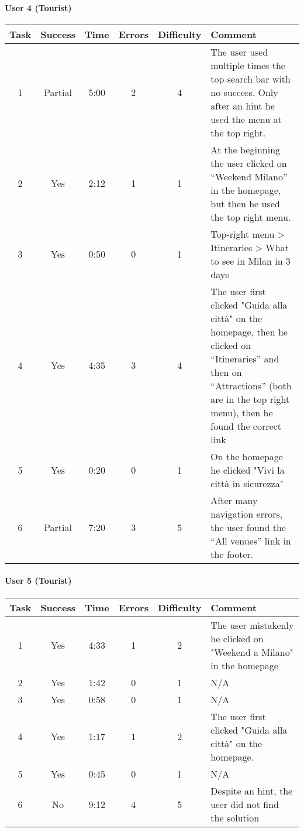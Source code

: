\begin{small}
\paragraph{User 4 (Tourist)}
\begin{tabularx}{\linewidth}{c c c c c X}
    \toprule
    \textbf{Task} & \textbf{Success} & \textbf{Time}
     & \textbf{Errors} & \textbf{Difficulty} & \textbf{Comment} \\
    \midrule
    1 & Partial & 5:00 & 2 & 4 & The user used multiple times the top search bar with no success. Only after an hint he used the menu at the top right. \\ \midrule
    2 & Yes & 2:12 & 1 & 1 & At the beginning the user clicked on ``Weekend Milano'' in the homepage, but then he used the top right menu.  \\ \midrule
    3 & Yes & 0:50 & 0 & 1 & Top-right menu > Itineraries > What to see in Milan in 3 days \\ \midrule
    4 & Yes & 4:35 & 3 & 4 & The user first clicked "Guida alla città" on the homepage, then he clicked on ``Itineraries'' and then on ``Attractions'' (both are in the top right menu), then he found the correct link \\ \midrule
    5 & Yes & 0:20 & 0 & 1 & On the homepage he clicked "Vivi la città in sicurezza" \\ \midrule
    6 & Partial & 7:20 & 3 & 5 & After many navigation errors, the user found the ``All venues'' link in the footer. \\ \bottomrule
\end{tabularx}

\paragraph{User 5 (Tourist)}
\begin{tabularx}{\linewidth}{c c c c c X}
    \toprule
    \textbf{Task} & \textbf{Success} & \textbf{Time}
     & \textbf{Errors} & \textbf{Difficulty} & \textbf{Comment} \\
    \midrule
    1 & Yes & 4:33 & 1 & 2 & The user mistakenly he clicked on "Weekend a Milano" in the homepage \\ \midrule
    2 & Yes & 1:42 & 0 & 1 & N/A \\ \midrule
    3 & Yes & 0:58 & 0 & 1 & N/A \\ \midrule
    4 & Yes & 1:17 & 1 & 2 & The user first clicked "Guida alla città" on the homepage. \\ \midrule
    5 & Yes & 0:45 & 0 & 1 & N/A \\ \midrule
    6 & No & 9:12 & 4 & 5 & Despite an hint, the user did not find the solution \\ \bottomrule
\end{tabularx}

\end{small}
